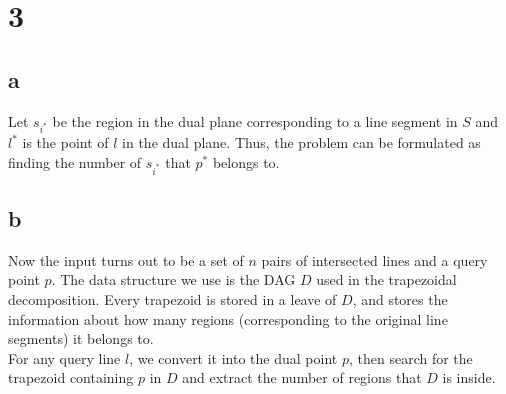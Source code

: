 \section*{3}
\subsection*{a}
Let $s_{i^*}$ be the region in the dual plane corresponding to a line segment in $S$ and $l^*$ is the point
of $l$ in the dual plane.  Thus, the problem can be formulated as finding the number
of $s_{i^*}$ that $p^*$ belongs to.

\subsection*{b}
Now the input turns out to be a set of $n$ pairs of intersected lines and a query point $p$. The data structure we use is the DAG $D$ used in the trapezoidal 
decomposition. Every trapezoid is stored in a leave of $D$, and stores the information about how many regions (corresponding to the original line segments) it belongs to. \\

For any query line $l$, we convert it into the dual point $p$, then search for the trapezoid containing $p$ in $D$ and extract the number of regions that $D$ is inside. \\


